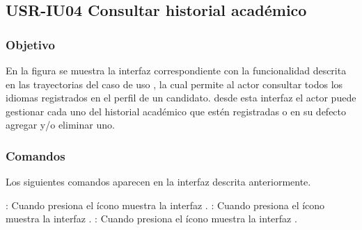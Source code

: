 \clearpage
\subsection{USR-IU04 Consultar historial académico}

\subsubsection{Objetivo}
En la figura  se muestra la interfaz correspondiente con la funcionalidad descrita en las
trayectorias del caso de uso , la cual permite al actor consultar todos los idiomas registrados en el perfil de un candidato.
desde esta interfaz el actor puede gestionar cada uno del historial académico que estén registradas o en su defecto agregar y/o eliminar uno.

\subsubsection{Comandos}
Los siguientes comandos aparecen en la interfaz descrita anteriormente.

\Titem \IUAgregar{} : Cuando presiona el ícono muestra la interfaz .
\Titem \IUEditar{} : Cuando presiona el ícono muestra la interfaz .
\Titem \IUEliminar{} : Cuando presiona el ícono muestra la interfaz .

\clearpage
